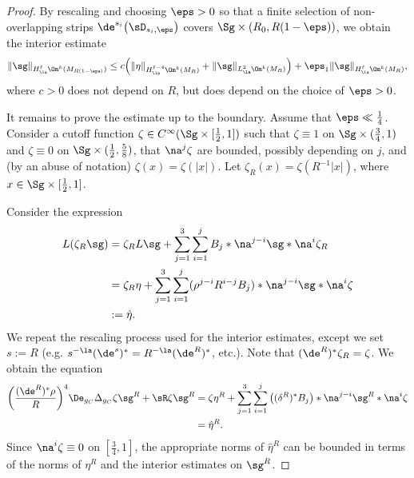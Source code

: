 \documentclass[hidelinks, 12pt, oneside, reqno]{amsart}
\begin{document}
\begin{proof}
    By rescaling and choosing $\eps > 0$ so that a finite selection of non-overlapping strips $\de^{s_i}\big( \sD_{s_i,\eps} \big)$ covers $\Sg \times (R_0, R(1-\eps))$, we obtain the interior estimate
    \begin{equation}\label{equation interior only estimates}
        \|\sg\|_{H^{\ell}_{\la}\Om^k(M_{R(1-\eps)})} \le c\Big(\|\eta\|_{H^{\ell-4}_{\la}\Om^k(M_R)} + \|\sg\|_{L^2_{\la}\Om^k(M_R)} \Big) + \eps_1 \|\sg\|_{H^{\ell}_{\la}\Om^k(M_{R})},
    \end{equation}
    where $c > 0$ does not depend on $R$, but does depend on the choice of $\eps > 0$.

    It remains to prove the estimate up to the boundary. Assume that $\eps \ll \tfrac14$. Consider a cutoff function $\zeta \in C^\infty(\Sg \times [\tfrac12,1])$ such that $\zeta \equiv 1$ on $\Sg \times (\tfrac34 , 1)$ and $\zeta \equiv 0$ on $\Sg \times (\tfrac12, \frac58)$, that $\na^j \zeta$ are bounded, possibly depending on $j$, and (by an abuse of notation) $\zeta(x) = \zeta(|x|)$. Let $\zeta_R(x) = \zeta (R^{-1}|x|)$, where $x \in \Sg \times [\tfrac12, 1]$. 

    Consider the expression
    \begin{align*}
        L(\zeta_R \sg) &= \zeta_R L\sg  + \sum_{j=1}^3 \sum_{i= 1}^j B_j * \na^{j-i}\sg * \na^i \zeta_R\\
        &= \zeta_R \eta + \sum_{j=1}^3 \sum_{i= 1}^j  (\rho^{j-i} R^{i-j} B_j) * \na^{j-i}\sg * \na^{i} \zeta \\
        &:= \hat \eta.
    \end{align*}
    We repeat the rescaling process used for the interior estimates, except we set $s := R$ (e.g. $s^{-\la}(\de^s)^*= R^{-\la}(\de^R)^*$, etc.). Note that $(\de^R)^* \zeta_R = \zeta$. We obtain the equation
    \begin{align*}
    \bigg(\frac{(\de^R)^* \rho}{R}\bigg)^4\De_{g_C} \Delta_{g_C} \zeta \sg^R + \sR\zeta \sg^R 
    & = \zeta \eta^R + \sum_{j=1}^3 \sum_{i= 1}^j  \big((\delta^R)^*B_j\big) * \na^{j-i}\sg^R * \na^{i} \zeta \\
    & = \hat \eta^R.
    \end{align*}
    Since $\na^i \zeta \equiv 0$ on $[\tfrac34 , 1]$, the appropriate norms of $\hat \eta^R$ can be bounded in terms of the norms of $\eta^R$ and the interior estimates on $\sg^R$. 


\end{proof}
\end{document}
